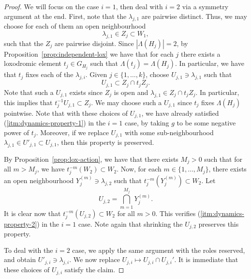 \documentclass[11pt,a4paper]{amsart}
\theoremstyle{definition}
\begin{document}
    \begin{proof}
        We will focus on the case $i = 1$, then deal with $i = 2$ via a symmetry argument at the end. 
        First, note that the $\lambda_{j,1}$ are pairwise distinct. Thus, we may choose for each of them an open neighbourhood 
        $$
        \lambda_{j,1} \in Z_j \subset W_1,
        $$
        such that the $Z_j$ are pairwise disjoint. Since $|\Lambda(H_j)| = 2$, by Proposition~\ref{prop:independent-lox} we have that for each $j$ there exists a loxodromic element $t_j \in G_{H_j}$ such that $\Lambda(t_j) = \Lambda(H_j)$. In particular, we have that $t_j$ fixes each of the $\lambda_{j,i}$. 
        Given $j \in \{1, \ldots, k\}$, choose $U_{j,1} \ni \lambda_{j,1}$ such that
        $$
        U_{j,1} \subset Z_{j} \cap t_jZ_{j}.
        $$
        Note that such a $U_{j,1}$ exists since $Z_j$ is open and $\lambda_{j,1} \in Z_{j} \cap t_jZ_{j}$. 
        In particular, this implies that $t_j^{-1}U_{j,1} \subset Z_j$. We may choose such a $U_{j,1}$ since $t_j$ fixes $\Lambda(H_j)$ pointwise. Note that with these choices of $U_{j,1}$, we have already satisfied (\ref{itm:dynamics-property-1}) in the $i=1$ case, by taking $g$ to be some negative power of $t_j$. Moreover, if we replace $U_{j,1}$ with some sub-neighbourhood $ \lambda_{j,1} \in U'_{j,1} \subset U_{j,1}$, then this property is preserved. 

        By Proposition~\ref{prop:lox-action}, we have that there exists $M_j > 0$ such that for all $m > M_j$, we have $t_j^{-m}(W_2) \subset W_2$. 
        Now, for each $m \in \{1, \ldots, M_j\}$, there exists an open neighbourhood $Y_j^{(m)} \ni \lambda_{j,2}$ such that $t_j^{-m}(Y_j^{(m)}) \subset W_2$. Let 
        $$
        U_{j,2} = \bigcap_{m=1}^{M_j} Y_j^{(m)}.
        $$
        It is clear now that $t_j^{-m}(U_{j,2}) \subset W_2$ for all $m > 0$. This verifies (\ref{itm:dynamics-property-2}) in the $i=1$ case. Note again that shrinking the $U_{j,2}$ preserves this property. 

        To deal with the $i=2$ case, we apply the same argument with the roles reserved, and obtain $U'_{j,i} \ni \lambda_{j,i}$. We now replace $U_{j,i} \mapsto U_{j,i} \cap U_{j,i}'$. It is immediate that these choices of $U_{j,i}$ satisfy the claim.
    \end{proof}
\end{document}
